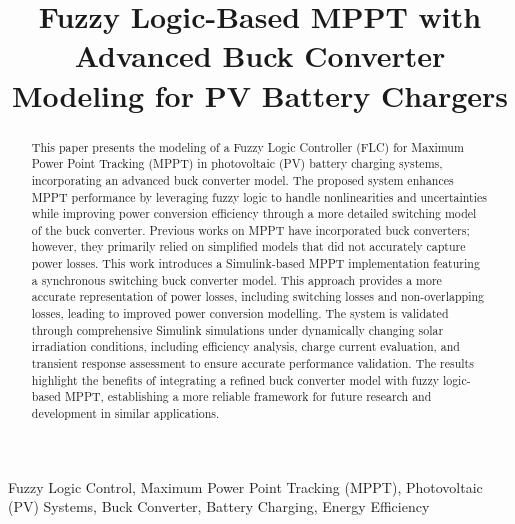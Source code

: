 \documentclass[conference]{IEEEtran}
\begin{document}

\title{Fuzzy Logic-Based MPPT with Advanced Buck Converter Modeling for PV Battery Chargers}

\author{
}
\maketitle

\begin{abstract}
This paper presents the modeling of a Fuzzy Logic Controller (FLC) for Maximum Power Point Tracking (MPPT) in photovoltaic (PV) battery charging systems, incorporating an advanced buck converter model.
The proposed system enhances MPPT performance by leveraging fuzzy logic to handle nonlinearities and uncertainties while improving power conversion efficiency through a more detailed switching model of the buck converter.
Previous works on MPPT have incorporated buck converters; however, they primarily relied on simplified models that did not accurately capture power losses. This work introduces a Simulink-based MPPT implementation featuring a synchronous switching buck converter model. This approach provides a more accurate representation of power losses, including switching losses and non-overlapping losses, leading to improved power conversion modelling.
The system is validated through comprehensive Simulink simulations under dynamically changing solar irradiation conditions, including efficiency analysis, charge current evaluation, and transient response assessment to ensure accurate performance validation. 
The results highlight the benefits of integrating a refined buck converter model with fuzzy logic-based MPPT, establishing a more reliable framework for future research and development in similar applications.
\end{abstract}

\begin{IEEEkeywords}
Fuzzy Logic Control, Maximum Power Point Tracking (MPPT), Photovoltaic (PV) Systems, Buck Converter, Battery Charging, Energy Efficiency
\end{IEEEkeywords}
\end{document}
